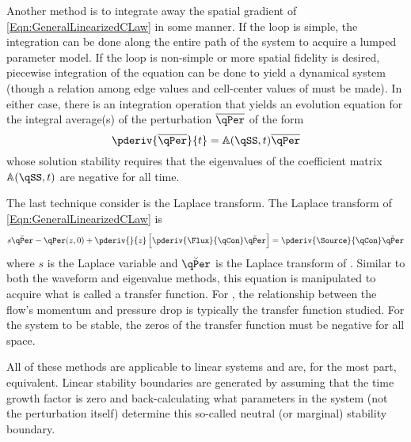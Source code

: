 Another method is to integrate away the spatial gradient of \cref{Eqn:GeneralLinearizedCLaw} in some manner.
If the loop is simple, the integration can be done along the entire path of the system to acquire a lumped parameter model.
If the loop is non-simple or more spatial fidelity is desired, piecewise integration of the equation can be done to yield a dynamical system (though a relation among edge values and cell-center values of \qPer must be made).
In either case, there is an integration operation that yields an evolution equation for the integral average(s) of the perturbation $\overline{\qPer}$ of the form
\begin{equation}
    \pderiv{\overline{\qPer}}{t} = \mathbb{A}(\qSS,t)\overline{\qPer}
    \label{Eqn:EigenvalueStability}
\end{equation}
whose solution stability requires that the eigenvalues of the coefficient matrix $\mathbb{A}(\qSS,t)$ are negative for all time.

The last technique consider is the Laplace transform.
The Laplace transform of \cref{Eqn:GeneralLinearizedCLaw} is 
\begin{equation}
    s \breve{\qPer} - \qPer(z,0) + \pderiv{}{z}\left[\pderiv{\Flux}{\qCon}\breve{\qPer} \right] = \pderiv{\Source}{\qCon}\breve{\qPer} 
    \label{Eqn:LaplaceTransform}
\end{equation}
where $s$ is the Laplace variable and $\breve{\qPer}$ is the Laplace transform of \qPer.
Similar to both the waveform and eigenvalue methods, this equation is manipulated to acquire what is called a transfer function.
For \TH, the relationship between the flow's momentum and pressure drop is typically the transfer function studied.
For the system to be stable, the zeros of the transfer function must be negative for all space.

All of these methods are applicable to linear systems and are, for the most part, equivalent.
Linear stability boundaries are generated by assuming that the time growth factor is zero and back-calculating what parameters in the system (not the perturbation itself) determine this so-called neutral (or marginal) stability boundary.




